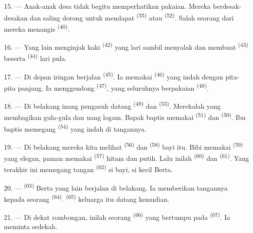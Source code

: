 15. --- Anak-anak desa tidak begitu memperhatikan pakaian. Mereka
berdesak-desakan dan saling dorong untuk mendapat 
\textsuperscript{(55)} atau  \textsuperscript{(52)}.
Salah seorang dari mereka menangis \textsuperscript{(40)}.

16. --- Yang lain menginjak kaki  \textsuperscript{(42)}
yang lari sambil menyalak dan membuat 
\textsuperscript{(43)} beserta 
\textsuperscript{(44)} lari pula.

\VUsaut{5.0mm}
\VUsaut{4.0mm}

17. --- Di depan iringan berjalan 
\textsuperscript{(45)}. Ia memakai 
\textsuperscript{(46)} yang indah dengan pita-pita panjang. Ia
menggendong  \textsuperscript{(47)}, yang
seluruhnya berpakaian  \textsuperscript{(48)}.

18. --- Di belakang inang pengasuh datang 
\textsuperscript{(49)} dan  \textsuperscript{(53)}.
Merekalah yang membagikan gula-gula dan uang logam. Bapak baptis
memakai  \textsuperscript{(51)} dan  \textsuperscript{(50)}. Ibu baptis memegang  \textsuperscript{(54)} yang indah di tangannya.

19. --- Di belakang mereka kita melihat 
\textsuperscript{(56)} dan  \textsuperscript{(58)} bayi
itu. Bibi memakai  \textsuperscript{(59)} yang elegan,
paman memakai  \textsuperscript{(57)} hitam dan
 putih. Lalu inilah 
\textsuperscript{(60)} dan 
\textsuperscript{(61)}. Yang terakhir ini memegang tangan
 \textsuperscript{(62)} si bayi, si kecil
Berta.

20. ---  \textsuperscript{(63)} Berta yang
lain berjalan di belakang. Ia memberikan tangannya kepada seorang
 \textsuperscript{(64)}. 
\textsuperscript{(65)} keluarga itu datang kemudian.

\VUsaut{4.6mm}
\VUsaut{3.4mm}

21. --- Di dekat rombongan, inilah seorang 
\textsuperscript{(66)} yang bertumpu pada 
\textsuperscript{(67)}. Ia meminta sedekah.

